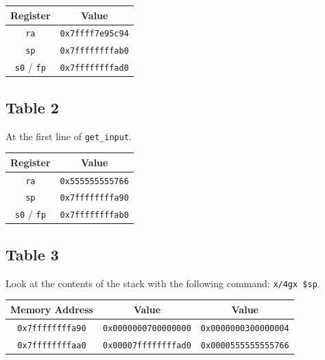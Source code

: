 \documentclass[12pt, letterpaper]{article}
\begin{document}
\begin{table}[h]
    \begin{center}
        \begin{tabular}{|c|c|}
            \hline
            \textbf{Register} & \textbf{Value} \\
            \hline
            \texttt{ra} & \texttt{0x7ffff7e95c94} \\
            \hline
            \texttt{sp} & \texttt{0x7ffffffffab0} \\
            \hline
            \texttt{s0} / \texttt{fp} & \texttt{0x7ffffffffad0} \\
            \hline
    \end{tabular}
    \end{center}
\end{table}
\FloatBarrier

\subsection*{Table 2}

At the first line of \texttt{get\_input}.

\begin{table}[h]
    \begin{center}
        \begin{tabular}{|c|c|}
            \hline
            \textbf{Register} & \textbf{Value} \\
            \hline
            \texttt{ra} & \texttt{0x555555555766} \\
            \hline
            \texttt{sp} & \texttt{0x7ffffffffa90} \\
            \hline
            \texttt{s0} / \texttt{fp}  & \texttt{0x7ffffffffab0} \\
            \hline
        \end{tabular}
    \end{center}
\end{table}
\FloatBarrier

\subsection*{Table 3}

Look at the contents of the stack with the following command: \texttt{x/4gx \$sp}.

\begin{table}[h]
    \begin{center}
        \begin{tabular}{|c|c|c|}
            \hline
            \textbf{Memory Address} & \textbf{Value} & \textbf{Value} \\
            \hline
            \texttt{0x7ffffffffa90} & \texttt{0x0000000700000000} & \texttt{0x0000000300000004} \\
            \hline
            \texttt{0x7ffffffffaa0} & \texttt{0x00007ffffffffad0} & \texttt{0x0000555555555766} \\
            \hline
        \end{tabular}
    \end{center}
\end{table}
\FloatBarrier
\end{document}
